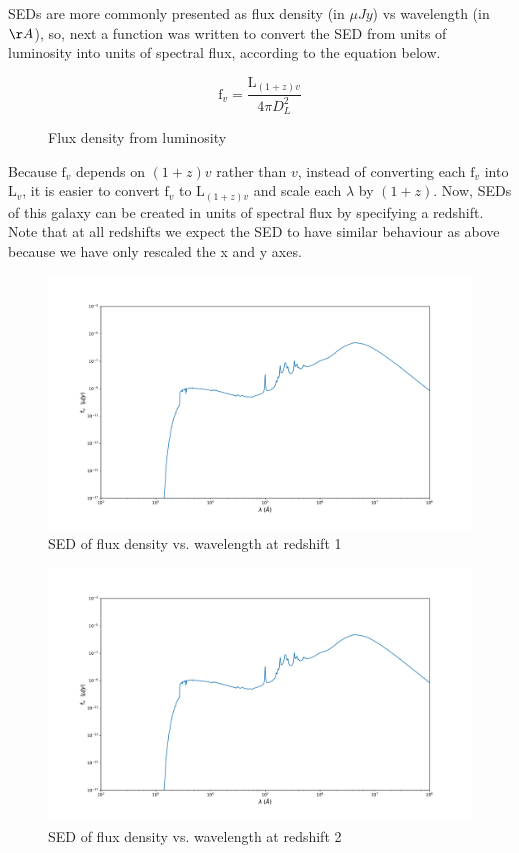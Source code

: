 \documentclass{article}
\begin{document}
SEDs are more commonly presented as flux density (in $\mu Jy$) vs wavelength (in $\AA$), so, next a
function was written to convert the SED from units of luminosity into units of spectral flux,
according to the equation below.

\begin{figure}[H]
\[\textrm{f}_v = \frac{\textrm{L}_{(1 + z)v}}{4\pi D_L^2} \]
\caption{Flux density from luminosity}
\end{figure}

Because $\textrm{f}_v$ depends on $(1 + z)v$ rather than $v$, instead of converting each $\textrm{f}_v$
into $\textrm{L}_v$, it is easier to convert $\textrm{f}_v$ to $\textrm{L}_{(1 + z)v}$
and scale each $\lambda$ by $(1 + z)$. Now, SEDs of this galaxy can be created in units of spectral flux by specifying a redshift. Note
that at all redshifts we expect the SED to have similar behaviour as above because we have only
rescaled the x and y axes.

\begin{figure}[H]
  \centering
\includegraphics[scale=0.3]{SED redshift 1}
\caption{SED of flux density vs. wavelength at redshift 1}
\end{figure}

\begin{figure}[H]
  \centering
\includegraphics[scale=0.3]{SED redshift 2}
\caption{SED of flux density vs. wavelength at redshift 2}
\end{figure}
\end{document}
